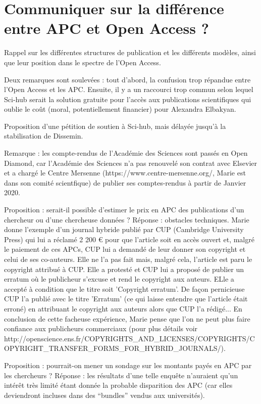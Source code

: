 \documentclass[a4paper]{article}
\begin{document}
\section{Communiquer sur la différence entre APC et Open Access ?}

Rappel sur les différentes structures de publication et les différents modèles, ainsi que leur position dans le spectre de l'Open Access.

Deux remarques sont soulevées : tout d'abord, la confusion trop répandue entre l'Open Access et les APC. Ensuite, il y a un raccourci trop commun selon lequel Sci-hub serait la solution gratuite pour l'accès aux publications scientifiques qui oublie le coût (moral, potentiellement financier) pour Alexandra Elbakyan. 

Proposition d'une pétition de soutien à Sci-hub, mais délayée jusqu'à la stabilisation de Dissemin. 

Remarque : les compte-rendus de l'Académie des Sciences sont passés en Open Diamond, car l'Académie des Sciences n'a pas renouvelé son contrat avec Elsevier et a chargé le Centre Mersenne (https://www.centre-mersenne.org/, Marie est dans son comité scientfique) de publier ses comptes-rendus à partir de Janvier 2020.

Proposition : serait-il possible d'estimer le prix en APC des publications d'un chercheur ou d'une chercheuse données ? Réponse : obstacles techniques.
Marie donne l'exemple d'un journal hybride publié par CUP (Cambridge University Press) qui lui a réclamé 2 200 € pour que l'article soit en accès ouvert et, malgré le paiement de ces APCs, CUP lui a demandé de leur donner son copyright et celui de ses co-auteurs. Elle ne l'a pas fait mais, malgré cela, l'article est paru le copyright attribué à CUP. Elle a protesté et CUP lui a proposé de publier un erratum où le publicheur s'excuse et rend le copyright aux auteurs. ELle a accepté à condition que le titre soit 'Copyright erratum'. De façon pernicieuse CUP l'a publié avec le titre 'Erratum' (ce qui laisse entendre que l'article était erroné) en attribuant le copyright aux auteurs alors que CUP l'a rédigé... En conclusion de cette facheuse expérience, Marie pense que l'on ne peut plus faire confiance aux publicheurs commerciaux (pour plus détails voir http://openscience.ens.fr/COPYRIGHTS_AND_LICENSES/COPYRIGHTS/COPYRIGHT_TRANSFER_FORMS_FOR_HYBRID_JOURNALS/). 

Proposition : pourrait-on mener un sondage sur les montants payés en APC par les chercheurs ? Réponse : les résultats d'une telle enquête n'auraient qu'un intérêt très limité étant donnée la probable disparition des APC (car elles deviendront incluses dans des ``bundles'' vendus aux universités). 
\end{document}
